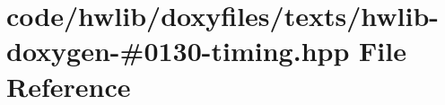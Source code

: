\hypertarget{hwlib-doxygen-#0130-timing_8hpp}{}\section{code/hwlib/doxyfiles/texts/hwlib-\/doxygen-\/\#0130-\/timing.hpp File Reference}
\label{hwlib-doxygen-#0130-timing_8hpp}
